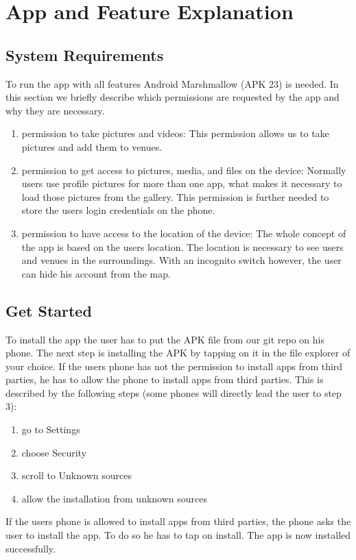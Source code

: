 \documentclass[11pt, accentcolor=tud1c]{tudreport}
\begin{document}
\chapter{App and Feature Explanation}\label{ch:app_and_feature_explanation}

\section{System Requirements}\label{sec:system_requirements}
To run the app with all features Android Marshmallow (APK 23) is needed. 
In this section we briefly describe which permissions are requested by the app and why they are necessary.
\begin{enumerate}
\item permission to take pictures and videos: This permission allows us to take pictures and add them to venues.
\item permission to get access to pictures, media, and files on the device: Normally users use profile pictures for more than one app, what makes it necessary to load those pictures from the gallery. This permission is further needed to store the users login credentials on the phone.
\item permission to have access to the location of the device: The whole concept of the app is based on the users location. The location is necessary to see users and venues in the surroundings. With an incognito switch however, the user can hide his account from the map.
\end{enumerate}

\section{Get Started}
To install the app the user has to put the APK file from our git repo on his phone. The next step is installing the APK by tapping on it in the file explorer of your choice. If the users phone has not the permission to install apps from third parties, he has to allow the phone to install apps from third parties. This is described by the following steps (some phones will directly lead the user to step 3):
\begin{enumerate}
\item go to Settings
\item choose Security
\item scroll to Unknown sources
\item allow the installation from unknown sources
\end{enumerate} 
If the users phone is allowed to install apps from third parties, the phone asks the user to install the app. To do so he has to tap on install. The app is now installed successfully.
\end{document}
